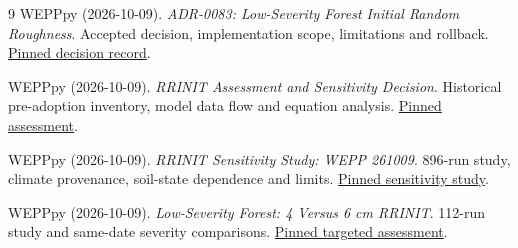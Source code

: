 \begin{thebibliography}{9}
WEPPpy (2026-10-09). \emph{ADR-0083: Low-Severity Forest Initial Random Roughness}.
Accepted decision, implementation scope, limitations and rollback.
\href{https://github.com/rogerlew/wepppy/blob/bae734d71165e58d610d5282d41684113b18b4ff/docs/adrs/ADR-0083-low-severity-forest-initial-random-roughness.md}{Pinned decision record}.

WEPPpy (2026-10-09). \emph{RRINIT Assessment and Sensitivity Decision}.
Historical pre-adoption inventory, model data flow and equation analysis.
\href{https://github.com/rogerlew/wepppy/blob/bae734d71165e58d610d5282d41684113b18b4ff/docs/work-packages/20261009_rrinit_parameter_review/assessment.md}{Pinned assessment}.

WEPPpy (2026-10-09). \emph{RRINIT Sensitivity Study: WEPP 261009}.
896-run study, climate provenance, soil-state dependence and limits.
\href{https://github.com/rogerlew/wepppy/blob/bae734d71165e58d610d5282d41684113b18b4ff/docs/work-packages/20261009_rrinit_parameter_review/sensitivity-results.md}{Pinned sensitivity study}.

WEPPpy (2026-10-09). \emph{Low-Severity Forest: 4 Versus 6 cm RRINIT}.
112-run study and same-date severity comparisons.
\href{https://github.com/rogerlew/wepppy/blob/bae734d71165e58d610d5282d41684113b18b4ff/docs/work-packages/20261009_rrinit_parameter_review/low-forest-4v6-results.md}{Pinned targeted assessment}.
\end{thebibliography}
